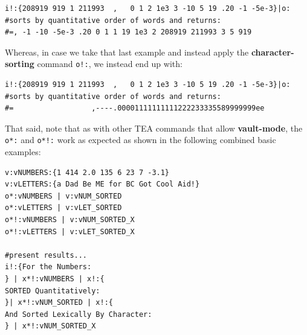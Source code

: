 \documentclass[a4paper, 18pt]{book} %
\begin{document}
{\vspace{2em}

  \begin{tcolorbox}[teaterminalstyle, title=O: EXAMPLE 6: Invalid Number Expressions result in Lexical Sorting, breakable]
  \begin{lstlisting}[language=TEA,breaklines=true,]
i!:{208919 919 1 211993  ,   0 1 2 1e3 3 -10 5 19 .20 -1 -5e-3}|o:
#sorts by quantitative order of words and returns:
#=, -1 -10 -5e-3 .20 0 1 1 19 1e3 2 208919 211993 3 5 919
   \end{lstlisting}
  \end{tcolorbox}


\vspace{2em}

Whereas, in case we take that last example and instead apply the \textbf{character-sorting} command \texttt{o!:}, we instead end up with:


\vspace{2em}

  \begin{tcolorbox}[teaterminalstyle, title=O: EXAMPLE 7: Character-level Lexical Sorting of Number Expressions?, breakable]
  \begin{lstlisting}[language=TEA,breaklines=true,]
i!:{208919 919 1 211993  ,   0 1 2 1e3 3 -10 5 19 .20 -1 -5e-3}|o:
#sorts by quantitative order of words and returns:
#=                  ,----.00001111111111222233335589999999ee
   \end{lstlisting}
  \end{tcolorbox}


\vspace{1em}


That said, note that as with other TEA commands that allow \textbf{vault-mode}, the \texttt{o*:} and \texttt{o*!:} work as expected as shown in the following combined basic examples:


\vspace{1em}

  \begin{tcolorbox}[teaterminalstyle, title=O: EXAMPLE 8: All Kinds of Sorting for Data in Vaults, breakable]
  \begin{lstlisting}[language=TEA,breaklines=true,]
v:vNUMBERS:{1 414 2.0 135 6 23 7 -3.1}
v:vLETTERS:{a Dad Be ME for BC Got Cool Aid!}
o*:vNUMBERS | v:vNUM_SORTED
o*:vLETTERS | v:vLET_SORTED
o*!:vNUMBERS | v:vNUM_SORTED_X
o*!:vLETTERS | v:vLET_SORTED_X

#present results...
i!:{For the Numbers:
} | x*!:vNUMBERS | x!:{
SORTED Quantitatively:
}| x*!:vNUM_SORTED | x!:{
And Sorted Lexically By Character:
} | x*!:vNUM_SORTED_X


\end{lstlisting}
\end{tcolorbox}}
\end{document}
